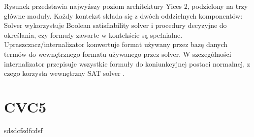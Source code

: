 Rysunek  przedstawia najwyższy poziom architektury Yices 2, podzielony na trzy główne moduły. Każdy kontekst składa się z dwóch oddzielnych komponentów: Solver wykorzystuje Boolean satisfiability solver i procedury decyzyjne do określania, czy formuły zawarte w kontekście są spełnialne. Upraszczacz/internalizator konwertuje format używany przez bazę danych termów do wewnętrznego formatu używanego przez solver. W szczególności
internalizator przepisuje wszystkie formuły do koniunkcyjnej postaci normalnej, z czego korzysta wewnętrzny SAT solver \cite{yices2manual}.

\section{CVC5}
sdsdcfsdfcdsf